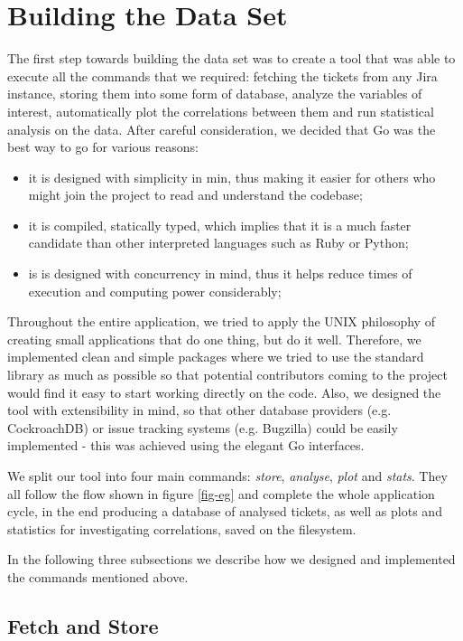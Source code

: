 \documentclass{mpaper}
\begin{document}
\section{Building the Data Set}\label{building}
The first step towards building the data set was to create a tool that was able to execute all the commands that we required:
fetching the tickets from any Jira instance, storing them into some form of database, analyze the variables of interest, 
automatically plot the correlations between them and run statistical analysis on the data. After careful consideration, 
we decided that Go was the best way to go for various reasons:
  \begin{itemize}
    \item it is designed with simplicity in min, thus making it easier for others who might join the project to read 
    and understand the codebase;
    \item it is compiled, statically typed, which implies that it is a much faster candidate than other interpreted languages
    such as Ruby or Python;
    \item is is designed with concurrency in mind, thus it helps reduce times of execution and computing power considerably;
  \end{itemize}

Throughout the entire application, we tried to apply the UNIX philosophy of creating small applications that do one thing, but 
do it well. Therefore, we implemented clean and simple packages where we tried to use the standard library as much as possible
so that potential contributors coming to the project would find it easy to start working directly on the code. Also, we designed 
the tool with extensibility in mind, so that other database providers (e.g. CockroachDB) or issue tracking systems (e.g. Bugzilla) 
could be easily implemented - this was achieved using the elegant Go interfaces. 

We split our tool into four main commands: \emph{store}, \emph{analyse}, \emph{plot} and \emph{stats}. They all 
follow the flow shown in figure \ref{fig-eg} and complete the whole application cycle, in the end producing a database 
of analysed tickets, as well as plots and statistics for investigating correlations, saved on the filesystem.

In the following three subsections we describe how we designed and implemented the commands mentioned above.

\subsection{Fetch and Store}
\end{document}
